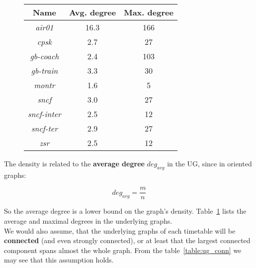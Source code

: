 \begin{figure}[htb]
{\begin{minipage}{0.45\textwidth}
		\centering
		\begin{tabular}{c|c|c}
			\rowcolor{tablehead}
			\textbf{Name} & \textbf{Avg. degree} & \textbf{Max. degree}\\
			\hline
			\textit{air01} & 16.3 & 166 \\
			\textit{cpsk} & 2.7 & 27 \\
			\textit{gb-coach} & 2.4 & 103 \\
			\textit{gb-train} & 3.3 & 30 \\
			\textit{montr} & 1.6 & 5 \\
			\textit{sncf} & 3.0 & 27 \\
			\textit{sncf-inter} & 2.5 & 12 \\
			\textit{sncf-ter} & 2.9 & 27 \\
			\textit{zsr} & 2.5 & 12 \\
		\end{tabular}
		\label{table:ug_degs}
	\end{minipage}
    }
	\end{figure}
	
	\noindent The density is related to the \textbf{average degree} $deg_{avg}$ in the UG, since in oriented graphs:
	
	$$deg_{avg} = \frac{\displaystyle m}{\displaystyle n}$$
	
	\noindent So the average degree is a lower bound on the graph's density. Table~\ref{table:ug_degs} lists the average and maximal degrees in the underlying graphs. \\
	
	\noindent We would also assume, that the underlying graphs of each timetable will be \textbf{connected} (and even strongly connected), or at least that the largest connected component spans almost the whole graph. From the table~\ref{table:ug_conn} we may see that this assumption holds. \\

